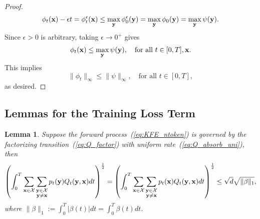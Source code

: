 \documentclass{article} %
\newtheorem{lemma}[theorem]{Lemma}
\def\eqref#1{equation~\ref{#1}}
\newcommand{\bfx}{{\bf x}}
\newcommand{\bfy}{ {\bf y}}
\renewcommand{\eqref}[1]{\textup{(\ref{#1})}}
\begin{document}
\begin{proof}
    \begin{equation*}
        \phi_t(\bfx)-\epsilon t= \phi_t^\epsilon(\bfx) \leq \max_\bfy \phi_0^\epsilon(\bfy) = \max_\bfy \phi_0(\bfy)= \max_\bfy \psi(\bfy).
    \end{equation*}
    Since $\epsilon>0$ is arbitrary, taking $\epsilon \to 0^+$ gives
    \begin{equation*}
        \phi_t(\bfx) \leq \max_\bfy \psi(\bfy), \quad \text{for all $t \in [0, T], \bfx$}.
    \end{equation*}
    This implies 
    $$
    \| \phi_t \|_\infty \leq \| \psi \|_\infty, \quad \text{for all $t \in [0, T]$},
    $$
    as desired.
\end{proof}

\subsection{Lemmas for the Training Loss Term}
\begin{lemma}\label{lemma:sum_uniform}
    Suppose the forward process~\eqref{eq:KFE_ntoken} is governed by the factorizing transition~\eqref{eq:Q_factor} with uniform rate~\eqref{eq:Q_absorb_uni}, then
    $$
    \left( \int_0^T \sum\limits_{\substack{\bfx\in\mathcal{X}}} \sum\limits_{\substack{\bfy\in\mathcal{X} \\ \bfy\neq \bfx}} 
    p_t(\bfy)  Q_t(\bfy, \bfx) dt\right)^{\frac{1}{2}} = \left( \int_0^T \sum\limits_{\substack{\bfx\in\mathcal{X}}} \sum\limits_{\substack{\bfy\in\mathcal{X} \\ \bfy\neq \bfx}} 
    p_t(\bfx)  Q_t(\bfy, \bfx) dt\right)^{\frac{1}{2}} \leq \sqrt{d} \sqrt{\|\beta\|_1},
    $$
    where $\|\beta\|_1 := \int_0^T |\beta(t)| dt=\int_0^T \beta(t) dt$.
\end{lemma}
\end{document}
